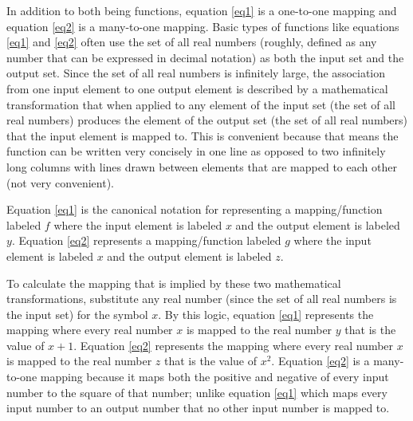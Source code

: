 In addition to both being functions, equation \ref{eq1} is a one-to-one mapping and equation \ref{eq2} is a many-to-one mapping. Basic types of functions like equations \ref{eq1} and \ref{eq2} often use the set of all real numbers (roughly, defined as any number that can be expressed in decimal notation) as both the input set and the output set. Since the set of all real numbers is infinitely large, the association from one input element to one output element is described by a mathematical transformation that when applied to any element of the input set (the set of all real numbers) produces the element of the output set (the set of all real numbers) that the input element is mapped to. This is convenient because that means the function can be written very concisely in one line as opposed to two infinitely long columns with lines drawn between elements that are mapped to each other (not very convenient). 

Equation \ref{eq1} is the canonical notation for representing a mapping/function labeled \begin{math}f\end{math} where the input element is labeled \begin{math}x\end{math} and the output element is labeled \begin{math}y\end{math}. Equation \ref{eq2} represents a mapping/function labeled \begin{math}g\end{math} where the input element is labeled \begin{math}x\end{math} and the output element is labeled \begin{math}z\end{math}. 

To calculate the mapping that is implied by these two mathematical transformations, substitute any real number (since the set of all real numbers is the input set) for the symbol \begin{math}x\end{math}. By this logic, equation \ref{eq1} represents the mapping where every real number \begin{math}x\end{math} is mapped to the real number \begin{math}y\end{math} that is the value of \begin{math}x + 1\end{math}. Equation \ref{eq2} represents the mapping where every real number \begin{math}x\end{math} is mapped to the real number \begin{math}z\end{math} that is the value of \begin{math}x^{2}\end{math}. Equation \ref{eq2} is a many-to-one mapping because it maps both the positive and negative of every input number to the square of that number; unlike equation \ref{eq1} which maps every input number to an output number that no other input number is mapped to.

